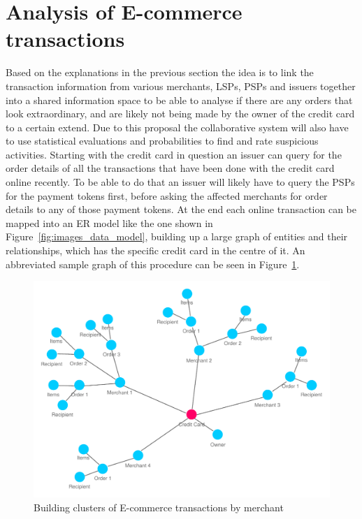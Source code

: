 
\section{Analysis of \gls{E-commerce} transactions}
\label{sec:analyse_transactions}

Based on the explanations in the previous section the idea is to link the transaction information from various merchants, \gls{LSP}s, \gls{PSP}s and issuers together into a shared information space to be able to analyse if there are any orders that look extraordinary, and are likely not being made by the owner of the credit card to a certain extend. Due to this proposal the collaborative system will also have to use statistical evaluations and probabilities to find and rate suspicious activities. Starting with the credit card in question an issuer can query for the order details of all the transactions that have been done with the credit card online recently. To be able to do that an issuer will likely have to query the \gls{PSP}s for the payment tokens first, before asking the affected merchants for order details to any of those payment tokens. At the end each online transaction can be mapped into an \gls{ER} model like the one shown in Figure~\ref{fig:images_data_model}, building up a large graph of entities and their relationships, which has the specific credit card in the centre of it. An abbreviated sample graph of this procedure can be seen in Figure~\ref{fig:images_credit_card_graph}. \@

\begin{figure}[H]
  \centering
  \includegraphics[width=0.9\columnwidth]{images/ontology_scenario_2.pdf}
  \caption{Building clusters of \gls{E-commerce} transactions by merchant}
\label{fig:images_credit_card_graph}
\end{figure}

